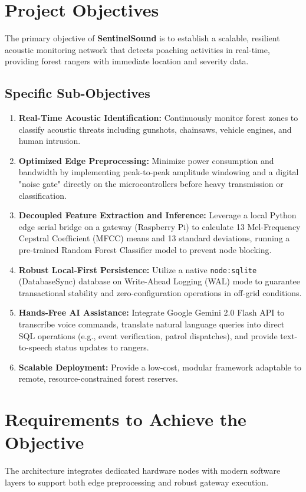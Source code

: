 \documentclass[11pt,a4paper]{article}
\begin{document}
\section{Project Objectives}
The primary objective of \textbf{SentinelSound} is to establish a scalable, resilient acoustic monitoring network that detects poaching activities in real-time, providing forest rangers with immediate location and severity data.

\subsection{Specific Sub-Objectives}
\begin{enumerate}
    \item \textbf{Real-Time Acoustic Identification:} Continuously monitor forest zones to classify acoustic threats including gunshots, chainsaws, vehicle engines, and human intrusion.
    \item \textbf{Optimized Edge Preprocessing:} Minimize power consumption and bandwidth by implementing peak-to-peak amplitude windowing and a digital "noise gate" directly on the microcontrollers before heavy transmission or classification.
    \item \textbf{Decoupled Feature Extraction and Inference:} Leverage a local Python edge serial bridge on a gateway (Raspberry Pi) to calculate 13 Mel-Frequency Cepstral Coefficient (MFCC) means and 13 standard deviations, running a pre-trained Random Forest Classifier model to prevent node blocking.
    \item \textbf{Robust Local-First Persistence:} Utilize a native \texttt{node:sqlite} (DatabaseSync) database on Write-Ahead Logging (WAL) mode to guarantee transactional stability and zero-configuration operations in off-grid conditions.
    \item \textbf{Hands-Free AI Assistance:} Integrate Google Gemini 2.0 Flash API to transcribe voice commands, translate natural language queries into direct SQL operations (e.g., event verification, patrol dispatches), and provide text-to-speech status updates to rangers.
    \item \textbf{Scalable Deployment:} Provide a low-cost, modular framework adaptable to remote, resource-constrained forest reserves.
\end{enumerate}

\section{Requirements to Achieve the Objective}
The architecture integrates dedicated hardware nodes with modern software layers to support both edge preprocessing and robust gateway execution.
\end{document}
